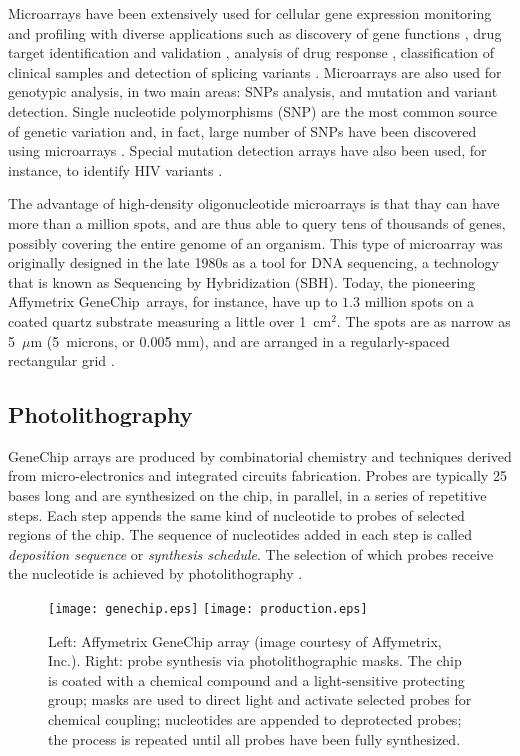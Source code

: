 Microarrays have been extensively used for cellular gene expression monitoring
and profiling \citep{Schena1995,Lockhart1996} with diverse applications such as
discovery of gene functions \citep{Cho1998,Hughes2000}, drug target
identification and validation \citep{Marton1998,Liotta2000}, analysis of drug
response \citep{Debouck1999}, classification of clinical samples
\citep{Perou1999} and detection of splicing variants \citep{Hu2001}. Microarrays
are also used for genotypic analysis, in two main areas: SNPs analysis, and
mutation and variant detection. Single nucleotide polymorphisms (SNP) are the
most common source of genetic variation and, in fact, large number of SNPs have
been discovered using microarrays \citep{Lindblad-Toh2000}. Special mutation
detection arrays have also been used, for instance, to identify HIV variants
\citep{Kozal1996}.

The advantage of high-density oligonucleotide microarrays is that thay can have
more than a million spots, and are thus able to query tens of thousands of
genes, possibly covering the entire genome of an organism. This type of
microarray was originally designed in the late 1980s as a tool for DNA
sequencing, a technology that is known as Sequencing by Hybridization (SBH).
Today, the pioneering Affymetrix GeneChip\textR\ arrays, for instance, have up
to $1.3$ million spots on a coated quartz substrate measuring a little over
1~cm$^2$. The spots are as narrow as 5~$\mu$m (5~microns, or 0.005 mm), and are
arranged in a regularly-spaced rectangular grid \citep{McGall2002}.

\subsection{Photolithography}

GeneChip arrays are produced by combinatorial chemistry and techniques derived
from micro-electronics and integrated circuits fabrication. Probes are typically
25 bases long and are synthesized on the chip, in parallel, in a series of
repetitive steps. Each step appends the same kind of nucleotide to probes of
selected regions of the chip. The sequence of nucleotides added in each step is
called \emph{deposition sequence} or \emph{synthesis schedule}. The selection of
which probes receive the nucleotide is achieved by photolithography
\citep{Fodor1991,Fodor1993,Lipshutz1999}.

\begin{figure}[t]\centering
\texttt{[image: genechip.eps]}
\hfill
\texttt{[image: production.eps]}
\caption{Left: Affymetrix GeneChip array (image courtesy of Affymetrix, Inc.).
  Right: probe synthesis via photolithographic masks. The chip is coated with a
  chemical compound and a light-sensitive protecting group; masks are used to
  direct light and activate selected probes for chemical coupling; nucleotides
  are appended to deprotected probes; the process is repeated until all probes
  have been fully synthesized.}
\label{fig:photolithography}
\end{figure}

